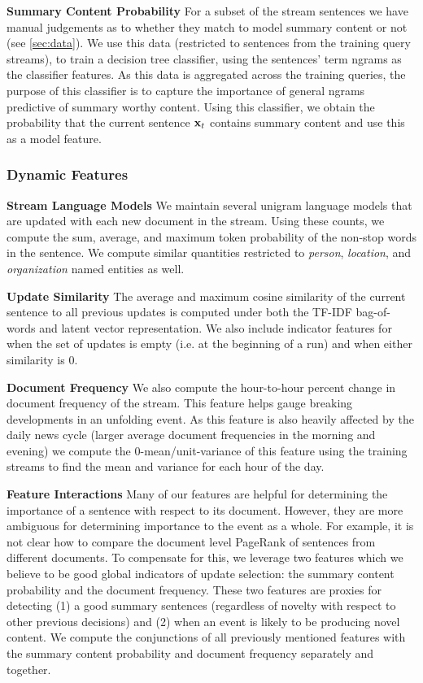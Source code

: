 \textbf{Summary Content Probability} For a subset of the stream sentences we
have manual judgements as to whether they match to model summary content or
not (see \ref{sec:data}). We use this
data (restricted to sentences from the training query streams), to train a
decision tree classifier, using the sentences' term ngrams as the classifier
features. As this data is aggregated across the training queries, the
purpose of this classifier is to capture the importance of general ngrams
predictive of summary worthy content.  
Using this classifier, we obtain the probability that the current sentence
$\mathbf{x}_t$ contains summary content and use this as a model feature.

\subsubsection{Dynamic Features}

\textbf{Stream Language Models} We maintain several unigram language models
that are updated with each new document in the stream. Using these counts,
we compute the sum, average, and maximum token probability of the non-stop
words in the sentence. We compute similar quantities restricted to
\textit{person}, \textit{location}, and \textit{organization} named
entities as well.

\textbf{Update Similarity} The average and maximum cosine similarity of the
current sentence to all previous updates is computed under both the TF-IDF
bag-of-words and latent vector representation. We also include indicator
features for when the set of updates is empty (i.e. at the beginning of a
run) and when either similarity is 0.

\textbf{Document Frequency} We also compute the hour-to-hour percent change
in document frequency of the stream. This feature helps gauge breaking
developments in an unfolding event. As this feature is also heavily affected
by the daily news cycle (larger average document frequencies in the morning
and evening) we compute the 0-mean/unit-variance of this feature using the
training streams to find the mean and variance for each hour of the day.

\textbf{Feature Interactions} Many of our features are helpful for
determining the importance of a sentence with respect to its document.
However, they are more ambiguous for determining importance to the event as
a whole. For example, it is not clear how to compare the document level
PageRank of sentences from different documents. To compensate for this, we
leverage two features which we believe to be good global indicators of
update selection: the summary content probability and the document
frequency.  These two features are proxies for detecting (1) a good summary
sentences (regardless of novelty with respect to other previous decisions)
and (2) when an event is likely to be producing novel content. We compute
the conjunctions of all previously mentioned features with the summary
content probability and document frequency separately and together.

